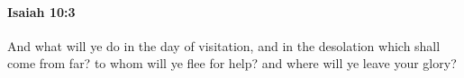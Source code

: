 
		\paragraph{Isaiah 10:3} %
			\label{ISAIAH-10-3}

			And what will ye do in the day of visitation, and in the desolation which shall come from far? to whom will ye flee for help? and where will ye leave your glory?


